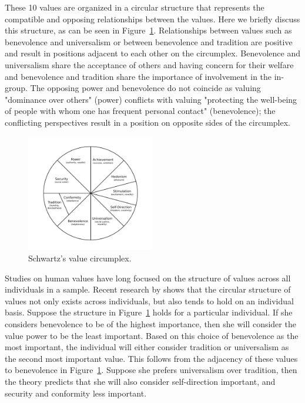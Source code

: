 \documentclass[12pt,letter]{article}\usepackage[]{graphicx}\usepackage[]{xcolor}
\begin{document}
These 10 values are organized in a circular structure that represents the compatible and opposing relationships between the values. Here we briefly discuss this structure, as can be seen in Figure~\ref{F:schwartz-circle}. Relationships between values such as benevolence and universalism or between benevolence and tradition are positive and result in positions adjacent to each other on the circumplex. Benevolence and universalism share the acceptance of others and having concern for their welfare and benevolence and tradition share the importance of involvement in the in-group. The opposing power and benevolence do not coincide as valuing "dominance over others" (power) conflicts with valuing  "protecting the well-being of people with whom one has frequent personal contact" (benevolence); the conflicting perspectives result in a position on opposite sides of the circumplex. 

\begin{figure}
\centering
  \includegraphics[width=0.5\textwidth]{figures/Schwartz-Circle-v2.pdf}
  \caption{Schwartz's value circumplex.} 
  \label{F:schwartz-circle}
\end{figure}

Studies on human values have long focused on the structure of values across all individuals in a sample. Recent research by \citet{borg2015} shows that the circular structure of values not only exists across individuals, but also tends to hold on an individual basis. Suppose the structure in Figure~\ref{F:schwartz-circle} holds for a particular individual. If she considers benevolence to be of the highest importance, then she will consider the value power to be the least important. Based on this choice of benevolence as the most important, the individual will either consider tradition or universalism as the second most important value. This follows from the adjacency of these values to benevolence in Figure~\ref{F:schwartz-circle}. Suppose she prefers universalism over tradition, then the theory predicts that she will also consider self-direction important, and security and conformity less important.
\end{document}
